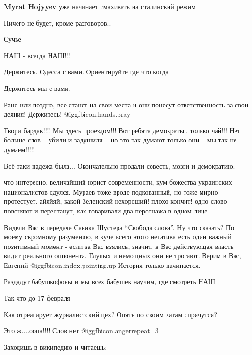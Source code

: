 \begin{itemize}
\textbf{Myrat Hojyyev} уже начинает смахивать на сталинский режим

Ничего не будет, кроме разговоров..

Сучье

НАШ - всегда НАШ!!!

Держитесь. Одесса с вами. Ориентируйте где что когда

Держитесь мы с вами.

Рано или поздно, все станет на свои места и они понесут ответственность за свои деяния! Держитесь!  @igg{fbicon.hands.pray} 


Твори бардак!!!! Мы здесь проездом!!! Вот ребята демократы.. только чай!!! Нет
больше слов... убили и задушили... но это так думают только они... мы так не
думаем!!!!!

Всё-таки надежа была... Окончательно продали совесть, мозги и демократию.


что интересно, величайший юрист современности, кум божества украинских
националистов сдулся. Мураев тоже вроде подкованный, но тоже мирно протестует.
айяйяй, какой Зеленский нехороший! плохо кончит! одно слово - повоняют и
перестанут, как говаривали два персонажа в одном лице


Видели Вас в передаче Савика Шустера \enquote{Свобода слова}. Ну что сказать?
По моему скромному разумению, в куче всего этого негатива есть один важный
позитивный момент - если за Вас взялись, значит, в Вас действующая власть видит
реального оппонента. Глупых и немощных они не трогают. Верим в Вас, Евгений
@igg{fbicon.index.pointing.up}  История только начинается.

Раздадут бабушкофоны и мы всех бабушек научим, где смотреть НАШ

Так что до 17 февраля

Как отреагирует журналистский цех? Опять по своим хатам спрячутся?

Это ж....оопа!!!! Слов нет @igg{fbicon.anger}{repeat=3} 


Заходишь в википедию и читаешь:


\end{itemize}
